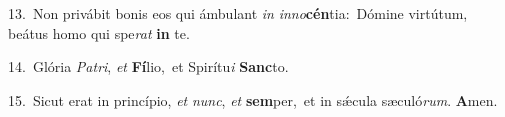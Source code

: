 {\numbfont\textcolor{\numbcolor}{13.}}~Non privábit bonis eos qui ámbulant \textit{in} \textit{in}\-\textit{no}\textbf{cén}tia:~\star Dómine virtútum, beátus homo qui spe\textit{rat} \textbf{in} te.\par
{\numbfont\textcolor{\numbcolor}{14.}}~Glória \textit{Pa}\-\textit{tri}, \textit{et} \textbf{Fí}\-lio,~\star et Spirítu\textit{i} \textbf{Sanc}\-to.\par
{\numbfont\textcolor{\numbcolor}{15.}}~Sicut erat in princípio, \textit{et} \textit{nunc}\-, \textit{et} \textbf{sem}\-per,~\star et in sǽcula sæculó\-\textit{rum}\-. \textbf{A}\-men.\par
